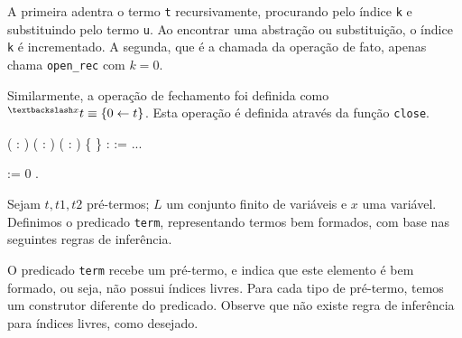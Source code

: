 A primeira adentra o termo \texttt{t} recursivamente, procurando pelo índice
\texttt{k} e substituindo pelo termo \texttt{u}. Ao encontrar uma abstração ou
substituição, o índice \texttt{k} é incrementado.  A segunda, que é a chamada da
operação de fato, apenas chama \texttt{open\_rec} com $k = 0$.

Similarmente, a operação de fechamento foi definida como $ ^{\textbackslash x}t
\equiv \{0 \leftarrow t\}$. Esta operação é definida através da função
\texttt{close}.

\bigskip

   ( :
)
( : ) ( : ) \{ \} :
 := ...\coqdoceol

    :=
 0
 .\coqdoceol

\bigskip

\begin{definicao}\label{def_term}
Sejam $t, t1, t2$ pré-termos; $L$ um conjunto finito de variáveis e $x$ uma variável.
Definimos o predicado \texttt{term}, representando termos bem
formados, com base nas seguintes regras de inferência.

\end{definicao}

O predicado \texttt{term} recebe um pré-termo, e indica que este elemento é bem
formado, ou seja, não possui índices livres. Para cada tipo de pré-termo, temos
um construtor diferente do predicado. Observe que não existe regra de inferência
para índices livres, como desejado.

